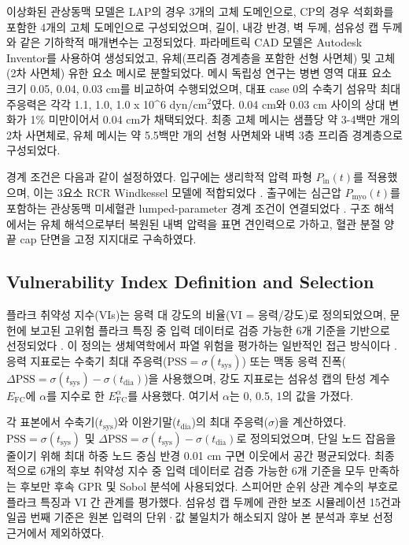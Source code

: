 \documentclass[preprint,12pt]{elsarticle}
\begin{document}
이상화된 관상동맥 모델은 LAP의 경우 3개의 고체 도메인으로, CP의 경우 석회화를 포함한 4개의 고체 도메인으로 구성되었으며, 길이, 내강 반경, 벽 두께, 섬유성 캡 두께와 같은 기하학적 매개변수는 고정되었다. 파라메트릭 CAD 모델은 Autodesk Inventor를 사용하여 생성되었고, 유체(프리즘 경계층을 포함한 선형 사면체) 및 고체(2차 사면체) 유한 요소 메시로 분할되었다. 메시 독립성 연구는 병변 영역 대표 요소 크기 0.05, 0.04, 0.03 cm를 비교하여 수행되었으며, 대표 case 0의 수축기 섬유막 최대 주응력은 각각 1.1, 1.0, 1.0 x 10\textasciicircum 6 dyn/cm$^2$였다. 0.04 cm와 0.03 cm 사이의 상대 변화가 1\% 미만이어서 0.04 cm가 채택되었다. 최종 고체 메시는 샘플당 약 3-4백만 개의 2차 사면체로, 유체 메시는 약 5.5백만 개의 선형 사면체와 내벽 3층 프리즘 경계층으로 구성되었다.

경계 조건은 다음과 같이 설정하였다. 입구에는 생리학적 압력 파형 $P_\text{in}(t)$를 적용했으며, 이는 3요소 RCR Windkessel 모델에 적합되었다 \cite{kim2010}. 출구에는 심근압 $P_\text{myo}(t)$를 포함하는 관상동맥 미세혈관 lumped-parameter 경계 조건이 연결되었다 \cite{kim2010}. 구조 해석에서는 유체 해석으로부터 복원된 내벽 압력을 표면 견인력으로 가하고, 혈관 분절 양 끝 cap 단면을 고정 지지대로 구속하였다.

\subsection{Vulnerability Index Definition and Selection}
플라크 취약성 지수(VIs)는 응력 대 강도의 비율(VI = 응력/강도)로 정의되었으며, 문헌에 보고된 고위험 플라크 특징 중 입력 데이터로 검증 가능한 6개 기준을 기반으로 선정되었다 \cite{naghavi2003} \cite{virmani2005,motoyama2009,burke1997,cheng1993,fernndezortz1994,shah2003}. 이 정의는 생체역학에서 파열 위험을 평가하는 일반적인 접근 방식이다 \cite{wal1999}. 응력 지표로는 수축기 최대 주응력($\text{PSS} = \sigma(t_\text{sys})$) 또는 맥동 응력 진폭($\Delta\text{PSS} = \sigma(t_\text{sys}) - \sigma(t_\text{dia})$)을 사용했으며, 강도 지표로는 섬유성 캡의 탄성 계수 $E_\text{FC}$에 $\alpha$를 지수로 한 $E_\text{FC}^\alpha$를 사용했다. 여기서 $\alpha$는 0, 0.5, 1의 값을 가졌다.

각 표본에서 수축기($t_\text{sys}$)와 이완기말($t_\text{dia}$)의 최대 주응력($\sigma$)을 계산하였다. $\text{PSS} = \sigma(t_\text{sys})$ 및 $\Delta\text{PSS} = \sigma(t_\text{sys}) - \sigma(t_\text{dia})$로 정의되었으며, 단일 노드 잡음을 줄이기 위해 최대 하중 노드 중심 반경 0.01 cm 구면 이웃에서 공간 평균되었다. 최종적으로 6개의 후보 취약성 지수 중 입력 데이터로 검증 가능한 6개 기준을 모두 만족하는 후보만 후속 GPR 및 Sobol 분석에 사용되었다. 스피어만 순위 상관 계수의 부호로 플라크 특징과 VI 간 관계를 평가했다. 섬유성 캡 두께에 관한 보조 시뮬레이션 15건과 일곱 번째 기준은 원본 입력의 단위·값 불일치가 해소되지 않아 본 분석과 후보 선정 근거에서 제외하였다.
\end{document}

